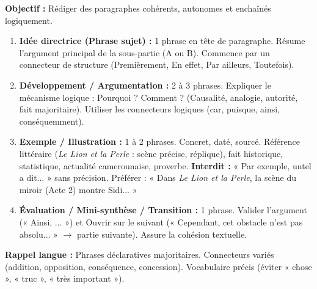 \documentclass[11pt]{article}
\newcommand{\cle}[1]{{\popxbold\color{popdark}#1}}
\begin{document}
\begin{methode}
\textbf{Objectif :} Rédiger des paragraphes cohérents, autonomes et enchaînés logiquement.
\begin{enumerate}
    \item \textbf{Idée directrice (Phrase sujet) :} 1 phrase en tête de paragraphe. Résume l'argument principal de la sous-partie (A ou B). Commence par un connecteur de structure (\cle{Premièrement}, \cle{En effet}, \cle{Par ailleurs}, \cle{Toutefois}).
    \item \textbf{Développement / Argumentation :} 2 à 3 phrases. Expliquer le mécanisme logique : \cle{Pourquoi ? Comment ?} (Causalité, analogie, autorité, fait majoritaire). Utiliser les connecteurs logiques (\cle{car}, \cle{puisque}, \cle{ainsi}, \cle{conséquemment}).
    \item \textbf{Exemple / Illustration :} 1 à 2 phrases. \cle{Concret, daté, sourcé.} Référence littéraire (\emph{Le Lion et la Perle} : scène précise, réplique), fait historique, statistique, actualité camerounaise, proverbe. \textbf{Interdit :} « Par exemple, untel a dit... » sans précision. Préférer : « Dans \emph{Le Lion et la Perle}, la scène du miroir (Acte 2) montre Sidi... »
    \item \textbf{Évaluation / Mini-synthèse / Transition :} 1 phrase. \cle{Valider l'argument} (« Ainsi, ... ») et \cle{Ouvrir sur le suivant} (« Cependant, cet obstacle n'est pas absolu... » $\rightarrow$ partie suivante). Assure la cohésion textuelle.
\end{enumerate}
\textbf{Rappel langue :} Phrases \cle{déclaratives} majoritaires. \cle{Connecteurs} variés (addition, opposition, conséquence, concession). Vocabulaire précis (éviter « chose », « truc », « très important »).
\end{methode}
\end{document}
